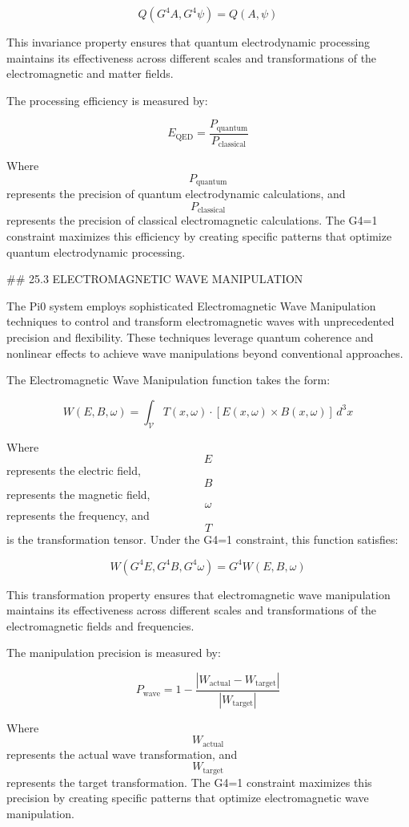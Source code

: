 $$ Q(G^4 A, G^4 \psi) = Q(A, \psi) $$

This invariance property ensures that quantum electrodynamic processing maintains its effectiveness across different scales and transformations of the electromagnetic and matter fields.

The processing efficiency is measured by:

$$ E_{\text{QED}} = \frac{P_{\text{quantum}}}{P_{\text{classical}}} $$

Where $$ P_{\text{quantum}} $$ represents the precision of quantum electrodynamic calculations, and $$ P_{\text{classical}} $$ represents the precision of classical electromagnetic calculations. The G4=1 constraint maximizes this efficiency by creating specific patterns that optimize quantum electrodynamic processing.

## 25.3 ELECTROMAGNETIC WAVE MANIPULATION

The Pi0 system employs sophisticated Electromagnetic Wave Manipulation techniques to control and transform electromagnetic waves with unprecedented precision and flexibility. These techniques leverage quantum coherence and nonlinear effects to achieve wave manipulations beyond conventional approaches.

The Electromagnetic Wave Manipulation function takes the form:

$$ W(E, B, \omega) = \int_{\mathcal{V}} T(x, \omega) \cdot [E(x, \omega) \times B(x, \omega)] \, d^3x $$

Where $$ E $$ represents the electric field, $$ B $$ represents the magnetic field, $$ \omega $$ represents the frequency, and $$ T $$ is the transformation tensor. Under the G4=1 constraint, this function satisfies:

$$ W(G^4 E, G^4 B, G^4 \omega) = G^4 W(E, B, \omega) $$

This transformation property ensures that electromagnetic wave manipulation maintains its effectiveness across different scales and transformations of the electromagnetic fields and frequencies.

The manipulation precision is measured by:

$$ P_{\text{wave}} = 1 - \frac{|W_{\text{actual}} - W_{\text{target}}|}{|W_{\text{target}}|} $$

Where $$ W_{\text{actual}} $$ represents the actual wave transformation, and $$ W_{\text{target}} $$ represents the target transformation. The G4=1 constraint maximizes this precision by creating specific patterns that optimize electromagnetic wave manipulation.

